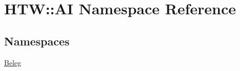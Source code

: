 \hypertarget{namespace_h_t_w_1_1_a_i}{\section{H\-T\-W\-:\-:A\-I Namespace Reference}
\label{namespace_h_t_w_1_1_a_i}
}
\subsection*{Namespaces}
\begin{DoxyCompactItemize}
\item 
\hyperlink{namespace_h_t_w_1_1_a_i_1_1_beleg}{Beleg}
\end{DoxyCompactItemize}

